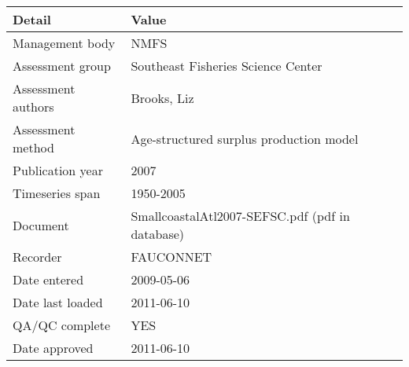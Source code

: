 \begin{table}[htb]
\centering
\begin{tabular}{lp{7cm}}
\toprule
Detail & Value \\
\midrule
Management body    & NMFS                                            \\
Assessment group   & Southeast Fisheries Science Center              \\
Assessment authors & Brooks, Liz                                     \\
Assessment method  & Age-structured surplus production model         \\
Publication year   & 2007                                            \\
Timeseries span    & 1950-2005                                       \\
Document           & SmallcoastalAtl2007-SEFSC.pdf (pdf in database) \\
Recorder           & FAUCONNET                                       \\
Date entered       & 2009-05-06                                      \\
Date last loaded   & 2011-06-10                                      \\
QA/QC complete     & YES                                             \\
Date approved      & 2011-06-10                                      \\
\bottomrule
\end{tabular}
\label{tab:assessdet}
\end{table}

